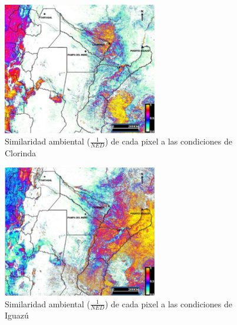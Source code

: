   \begin{figure}[hbt]
    \centering%
    \includegraphics[width=0.6\textwidth]{images/ned_clorinda}%
    \caption{Similaridad ambiental ($\frac{1}{NED}$)
            de cada pixel a las condiciones de Clorinda}\label{fig:ned_clorinda}
  \end{figure}

  \begin{figure}[hbt]
    \centering%
    \includegraphics[width=0.6\textwidth]{images/ned_iguazu}%
    \caption{Similaridad ambiental ($\frac{1}{NED}$)
            de cada pixel a las condiciones de Iguazú}\label{fig:ned_iguazu}
  \end{figure}


